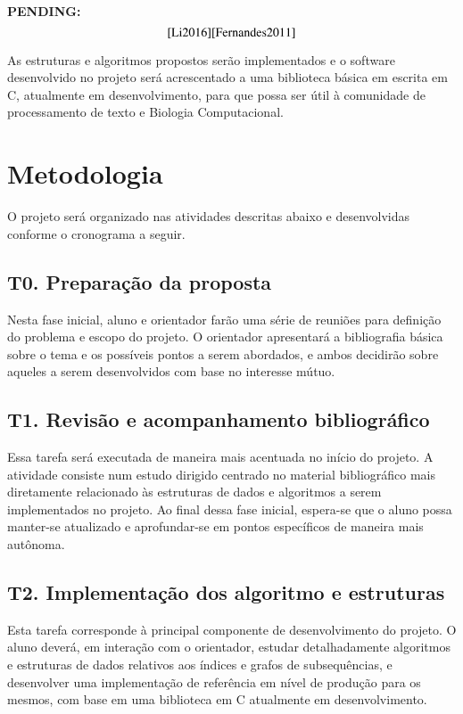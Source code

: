 \documentclass[12pt, a4paper, oneside]{article}
\newcommand{\pending}[1]{\textbf{PENDING:\[#1\]}}
\begin{document}
\pending{\cite{Li2016}\cite{Fernandes2011}}



As estruturas e algoritmos propostos serão implementados e o  software desenvolvido no projeto será acrescentado a uma biblioteca básica em escrita em C, atualmente em desenvolvimento, para que possa ser útil à comunidade de processamento de texto e Biologia Computacional.


\clearpage
\section{Metodologia}

O projeto será organizado nas atividades descritas abaixo e desenvolvidas conforme o cronograma a seguir.

\subsection*{T0. Preparação da proposta}

Nesta fase inicial, aluno e orientador farão uma série de reuniões para definição do problema e escopo do projeto. O orientador apresentará a bibliografia básica sobre o tema e os possíveis pontos a serem abordados, e ambos decidirão sobre aqueles a serem desenvolvidos com base no  interesse mútuo.

\subsection*{T1. Revisão e acompanhamento bibliográfico}

Essa tarefa será executada de maneira mais acentuada no início do projeto. A atividade consiste num estudo dirigido centrado no  material bibliográfico mais diretamente relacionado às estruturas de dados e algoritmos a serem implementados no projeto. Ao final dessa fase inicial, espera-se que o aluno possa manter-se atualizado e aprofundar-se em pontos específicos de maneira mais autônoma.


\subsection*{T2. Implementação dos algoritmo e estruturas}

Esta tarefa corresponde à principal componente de desenvolvimento do projeto. O aluno deverá, em interação com o orientador, estudar detalhadamente algoritmos e estruturas de dados relativos aos índices e grafos de subsequências, e desenvolver uma implementação de referência em nível de produção para os mesmos, com base em uma biblioteca em C atualmente em desenvolvimento.
\end{document}
